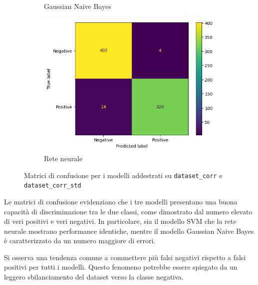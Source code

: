 \begin{figure}[!ht]
\begin{subfigure}{.3\textwidth}
        \caption{Gaussian Naive Bayes}
        \label{fig:matrice_di_confusione_per_GNB_corr}
    \end{subfigure}
    \hfill
    \begin{subfigure}{.3\textwidth}
        \centering
        \includegraphics[width=\textwidth]{img/rete/matrice_confusione.png}
        \caption{Rete neurale}
        \label{fig:matrice_di_confusione_per_NN_corr}
    \end{subfigure}
    \caption{Matrici di confusione per i modelli addestrati su \texttt{dataset\_corr} e \texttt{dataset\_corr\_std}}
    \label{fig:matrice_di_confusione_per_corr}
\end{figure}

Le matrici di confusione evidenziano che i tre modelli presentano una buona
capacità di discriminazione tra le due classi, come dimostrato dal numero
elevato di veri positivi e veri negativi. In particolare, sia il modello SVM che
la rete neurale mostrano performance identiche, mentre il modello Gaussian Naive
Bayes è caratterizzato da un numero maggiore di errori.

Si osserva una tendenza comune a commettere più falsi negativi rispetto a falsi 
positivi per tutti i modelli.
Questo fenomeno potrebbe essere spiegato da un leggero sbilanciamento del dataset
verso la classe negativa.

